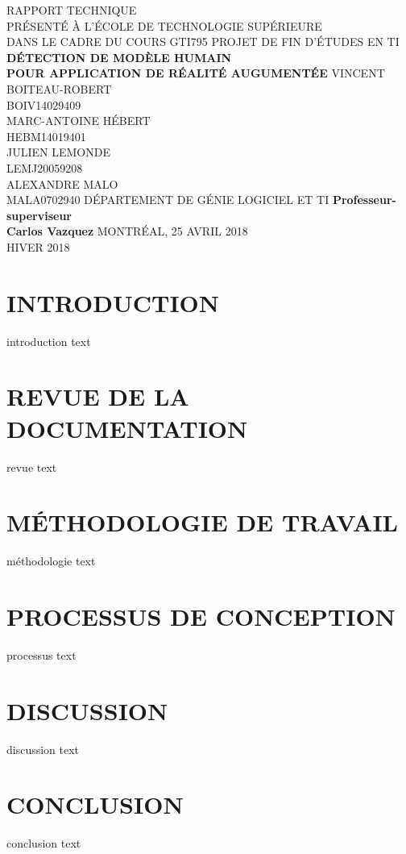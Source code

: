 \documentclass[letterpaper,twoside,12pt]{report}
\newcommand{\reportTitle}{\uppercase{Détection de modèle humain\\Pour application de réalité augumentée}}
\newcommand{\reportAuthors}{\uppercase{Vincent Boiteau-Robert\\BOIV14029409\\Marc-Antoine Hébert\\HEBM14019401\\Julien Lemonde\\LEMJ20059208\\Alexandre Malo\\MALA0702940}}
\begin{document}
\begin{titlepage}
    \begin{center}
        \vfill
        \uppercase{Rapport technique\\Présenté à l'école de technologie supérieure\\Dans le cadre du cours GTI795 Projet de fin d'études en TI}
        \vfill
        \textbf{\reportTitle}
        \vfill
        \reportAuthors
        \vfill
        \uppercase{Département de génie logiciel et TI}
        \vfill
        \textbf{Professeur-superviseur\\Carlos Vazquez}
        \vfill
        \uppercase{Montréal, 25 avril 2018\\Hiver 2018}
        \vfill
    \end{center}
\end{titlepage}
\begin{abstract}
    \begin{center}{}
        \textbf{\reportTitle}
        \\ \vspace{1\baselineskip}
        \reportAuthors
        \\ \vspace{1\baselineskip}
        text résumé ici
    \end{center}
    \vspace{-\baselineskip}
\end{abstract}
\tableofcontents
\listoftables
\listoffigures
\cleardoublepage
{}
\chapter*{\uppercase{Introduction}}
introduction text
\chapter*{\uppercase{Revue de la documentation}}
revue text
\chapter*{\uppercase{Méthodologie de travail}}
méthodologie text
\chapter*{\uppercase{Processus de conception}}
processus text
\chapter*{\uppercase{Discussion}}
discussion text
\chapter*{\uppercase{Conclusion}}
conclusion text
\end{document}
